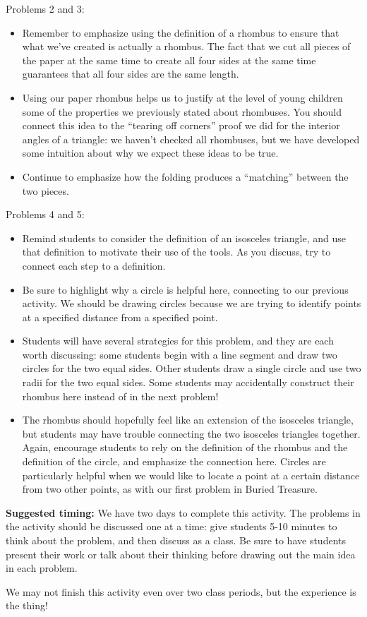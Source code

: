 \documentclass[noauthor, nooutcomes,handout]{ximera}
\begin{document}
\begin{instructorNotes}
Problems 2 and 3:
\begin{itemize}
	\item Remember to emphasize using the definition of a rhombus to ensure that what we've created is actually a rhombus. The fact that we cut all pieces of the paper at the same time to create all four sides at the same time guarantees that all four sides are the same length.
	\item Using our paper rhombus helps us to justify at the level of young children some of the properties we previously stated about rhombuses. You should connect this idea to the ``tearing off corners'' proof we did for the interior angles of a triangle: we haven't checked all rhombuses, but we have developed some intuition about why we expect these ideas to be true.
	\item Continue to emphasize how the folding produces a ``matching'' between the two pieces. 
\end{itemize}

Problems 4 and 5:
\begin{itemize}
	\item Remind students to consider the definition of an isosceles triangle, and use that definition to motivate their use of the tools. As you discuss, try to connect each step to a definition.
	\item Be sure to highlight why a circle is helpful here, connecting to our previous activity. We should be drawing circles because we are trying to identify points at a specified distance from a specified point.
	\item Students will have several strategies for this problem, and they are each worth discussing: some students begin with a line segment and draw two circles for the two equal sides. Other students draw a single circle and use two radii for the two equal sides. Some students may accidentally construct their rhombus here instead of in the next problem!
	\item The rhombus should hopefully feel like an extension of the isosceles triangle, but students may have trouble connecting the two isosceles triangles together. Again, encourage students to rely on the definition of the rhombus and the definition of the circle, and emphasize the connection here. Circles are particularly helpful when we would like to locate a point at a certain distance from two other points, as with our first problem in Buried Treasure.
\end{itemize}


{\bf Suggested timing:} We have two days to complete this activity. The problems in the activity should be discussed one at a time: give students 5-10 minutes to think about the problem, and then discuss as a class. Be sure to have students present their work or talk about their thinking before drawing out the main idea in each problem. 

We may not finish this activity even over two class periods, but the experience is the thing!
\end{instructorNotes}
\end{document}
